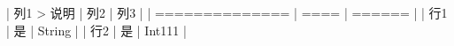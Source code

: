 ﻿| 列1 > 说明 | 列2 | 列3   |
| ============== | ==== | ====== |
| 行1    | 是   | String |
| 行2       | 是   | Int111    |
